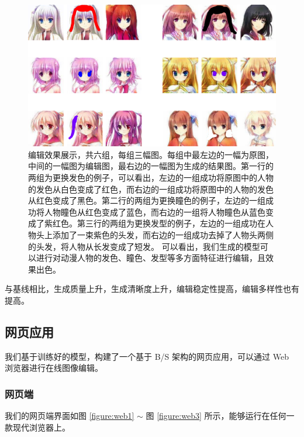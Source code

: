\documentclass[a4paper,12pt,UTF8]{ctexart}
\newcommand{\kai}{\CJKfamily{zhkai}}	%
\begin{document}
\begin{figure}[H]
  \centering
  \includegraphics[width=0.9\linewidth]{figs/pic.pdf}
  \caption{\kai 编辑效果展示，共六组，每组三幅图。每组中最左边的一幅为原图，中间的一幅图为编辑图，最右边的一幅图为生成的结果图。第一行的两组为更换发色的例子，可以看出，左边的一组成功将原图中的人物的发色从白色变成了红色，而右边的一组成功将原图中的人物的发色从红色变成了黑色。第二行的两组为更换瞳色的例子，左边的一组成功将人物瞳色从红色变成了蓝色，而右边的一组将人物瞳色从蓝色变成了紫红色。第三行的两组为更换发型的例子，左边的一组成功在人物头上添加了一束紫色的头发，而右边的一组成功去掉了人物头两侧的头发，将人物从长发变成了短发。
  可以看出，我们生成的模型可以进行对动漫人物的发色、瞳色、发型等多方面特征进行编辑，且效果出色。}
  \label{fig:pic}
\end{figure}

与基线相比，生成质量上升，生成清晰度上升，编辑稳定性提高，编辑多样性也有提高。

\subsection{网页应用}

我们基于训练好的模型，构建了一个基于 B/S 架构的网页应用，可以通过 Web 浏览器进行在线图像编辑。

\subsubsection{网页端}
我们的网页端界面如图 \ref{figure:web1} $\sim$ 图 \ref{figure:web3}  所示，能够运行在任何一款现代浏览器上。
\end{document}
